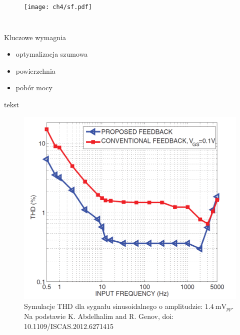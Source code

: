\begin{columns}

    \begin{figure}[H]
        \texttt{[image: ch4/sf.pdf]}
    \end{figure}


\end{columns}

\begin{block}{Kluczowe wymagnia}
    \begin{itemize}
        \item optymalizacja szumowa
        \item powierzchnia
        \item pobór mocy
    \end{itemize}
     \end{block}


 {\renewcommand\normalsize{\small}%
\normalsize
tekst
}

\begin{figure}[H]
    \centering
    \includegraphics[scale=0.2]{Figures/genovTHD.png}
    \caption{Symulacje THD dla sygnału sinusoidalnego o amplitudzie: $\SI{1.4}{\milli\volt_{pp}}$. Na podstawie K. Abdelhalim and R. Genov, doi: 10.1109/ISCAS.2012.6271415}
\end{figure}